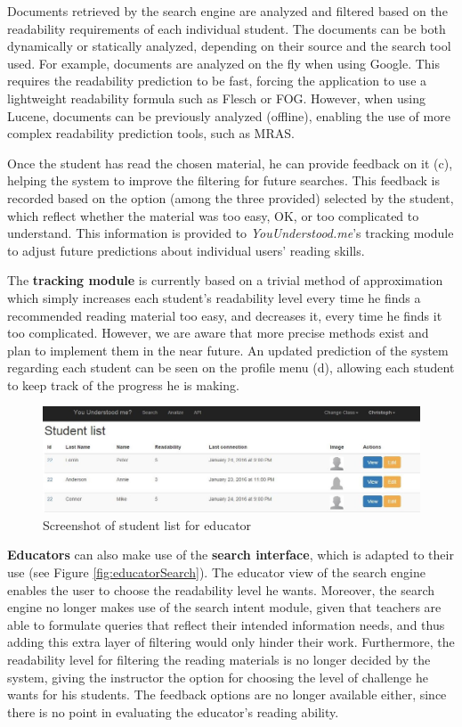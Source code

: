 \documentclass{sig-alternate-05-2015}
\begin{document}
Documents retrieved by the search engine are analyzed and filtered based on the readability requirements of each individual student. The documents can be both dynamically or statically analyzed, depending on their source and the search tool used. For example, documents are analyzed on the fly when using Google. This requires the readability prediction to be fast, forcing the application to use a lightweight readability formula such as Flesch or FOG. However, when using Lucene, documents can be previously analyzed (offline), enabling the use of more complex readability prediction tools, such as MRAS.

Once the student has read the chosen material, he can provide feedback on it (c), helping the system to improve the filtering for future searches. This feedback is recorded based on the option (among the three provided) selected by the student, which reflect whether the material was too easy, OK, or too complicated to understand. This information is provided to \textit{YouUnderstood.me}'s tracking module to adjust future predictions about individual users' reading skills.

The \textbf{tracking module} is currently based on a trivial method of approximation which simply increases each student's readability level every time he finds a recommended reading material too easy, and decreases it, every time he finds it too complicated. However, we are aware that more precise methods exist and plan to implement them in the near future. An updated prediction of the system regarding each student can be seen on the profile menu (d), allowing each student to keep track of the progress he is making.
\begin{figure}[ht]
 \centering
  \includegraphics[width=1\textwidth]{creatingFigures/Capture19}
 \caption{Screenshot of student list for educator}
  \label{fig:studentList}
 \end{figure}

\textbf{Educators} can also make use of the \textbf{search interface}, which is adapted to their use (see Figure \ref{fig:educatorSearch}). The educator view of the search engine enables the user to choose the readability level he wants. Moreover, the search engine no longer makes use of the search intent module, given that teachers are able to formulate queries that reflect their intended information needs, and thus adding this extra layer of filtering would only hinder their work. Furthermore, the readability level for filtering the reading materials is no longer decided by the system, giving the instructor the option for choosing the level of challenge he wants for his students. The feedback options are no longer available either, since there is no point in evaluating the educator's reading ability.
\end{document}
